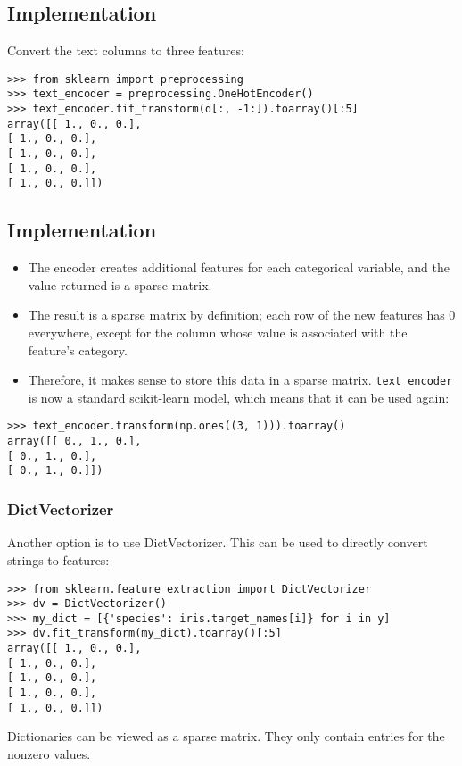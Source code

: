 \documentclass[SKL-MASTER.tex]{subfiles}
\begin{document}
\subsection*{Implementation}
Convert the text columns to three features:
\begin{framed}
\begin{verbatim}
>>> from sklearn import preprocessing
>>> text_encoder = preprocessing.OneHotEncoder()
>>> text_encoder.fit_transform(d[:, -1:]).toarray()[:5]
array([[ 1., 0., 0.],
[ 1., 0., 0.],
[ 1., 0., 0.],
[ 1., 0., 0.],
[ 1., 0., 0.]])
\end{verbatim}
\end{framed}
\subsection*{Implementation}
\begin{itemize}
\item The encoder creates additional features for each categorical variable, and the value returned
is a sparse matrix. 
\item The result is a sparse matrix by definition; each row of the new features has
0 everywhere, except for the column whose value is associated with the feature's category.
\item Therefore, it makes sense to store this data in a sparse matrix.
\texttt{text\_encoder} is now a standard scikit-learn model, which means that it can be used again:
\end{itemize}

\begin{framed}
\begin{verbatim}
>>> text_encoder.transform(np.ones((3, 1))).toarray()
array([[ 0., 1., 0.],
[ 0., 1., 0.],
[ 0., 1., 0.]])
\end{verbatim}
\end{framed}
\subsubsection*{DictVectorizer}
Another option is to use DictVectorizer. This can be used to directly convert strings
to features:
\begin{framed}
\begin{verbatim}
>>> from sklearn.feature_extraction import DictVectorizer
>>> dv = DictVectorizer()
>>> my_dict = [{'species': iris.target_names[i]} for i in y]
>>> dv.fit_transform(my_dict).toarray()[:5]
array([[ 1., 0., 0.],
[ 1., 0., 0.],
[ 1., 0., 0.],
[ 1., 0., 0.],
[ 1., 0., 0.]])
\end{verbatim}
\end{framed}
Dictionaries can be viewed as a sparse matrix. They only contain
entries for the nonzero values.
\end{document}
